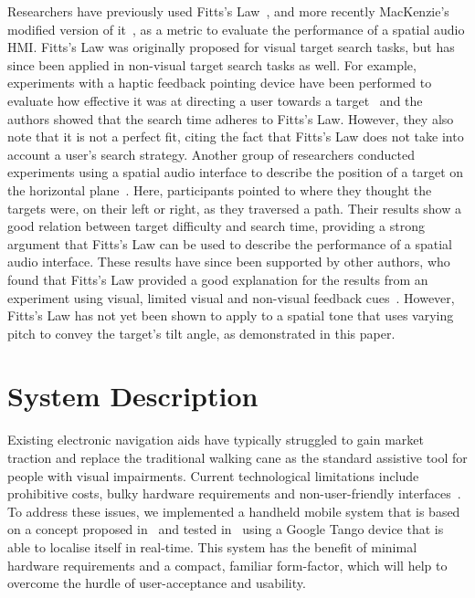 \documentclass[]{interact}
\begin{document}
Researchers have previously used Fitts's Law~\citep{fitts1954information}, and more recently MacKenzie's modified version of it~\citep{mackenzie1992fitts}, as a metric to evaluate the performance of a spatial audio HMI\@.
Fitts's Law was originally proposed for visual target search tasks, but has since been applied in non-visual target search tasks as well.
For example, experiments with a haptic feedback pointing device have been performed to evaluate how effective it was at directing a user towards a target~\citep{ahmaniemi2009augmented} and the authors showed that the search time adheres to Fitts's Law.
However, they also note that it is not a perfect fit, citing the fact that Fitts's Law does not take into account a user's search strategy.
Another group of researchers conducted experiments using a spatial audio interface to describe the position of a target on the horizontal plane~\citep{marentakis2006effects}.
Here, participants pointed to where they thought the targets were, on their left or right, as they traversed a path.
Their results show a good relation between target difficulty and search time, providing a strong argument that Fitts's Law can be used to describe the performance of a spatial audio interface.
These results have since been supported by other authors, who found that Fitts's Law provided a good explanation for the results from an experiment using visual, limited visual and non-visual feedback cues~\citep{wu2010fitts}.
However, Fitts's Law has not yet been shown to apply to a spatial tone that uses varying pitch to convey the target's tilt angle, as demonstrated in this paper.

\section{System Description}\label{sec:system-description}

Existing electronic navigation aids have typically struggled to gain market traction and replace the traditional walking cane as the standard assistive tool for people with visual impairments.
Current technological limitations include prohibitive costs, bulky hardware requirements and non-user-friendly interfaces~\cite{golledge2004stated,yusif2016older,arditi2013user}.
To address these issues, we implemented a handheld mobile system that is based on a concept proposed in~\cite{lock2017portable,lock2019active} and tested in~\cite{lock2019bone} using a Google Tango device that is able to localise itself in real-time.
This system has the benefit of minimal hardware requirements and a compact, familiar form-factor, which will help to overcome the hurdle of user-acceptance and usability.
\end{document}
